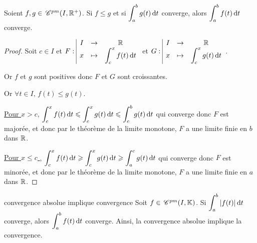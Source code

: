 \begin{proposition}{}{}
    Soient $f, g \in \,\mathscr C^{pm}(I, \mathbb{R}^+)$. Si $f \leqslant g$ et si
    $\displaystyle \int_{a }^{b } g(t) \,\mathrm{d}t$ converge, alors $\displaystyle \int_{a }^{b } f(t) \,\mathrm{d}t$ converge.
\end{proposition}


\begin{proof}
    Soit $c \in I$ et $F: \space \begin{array}{|ccc} \displaystyle I & \to & \displaystyle \mathbb{R} \\ \displaystyle x & \mapsto & \displaystyle \int_c^x f(t) \,\mathrm{d}t \end{array}$ et $G: \space \begin{array}{|ccc} \displaystyle I & \to & \displaystyle \mathbb{R} \\ \displaystyle x & \mapsto & \displaystyle \int_c^x g(t) \,\mathrm{d}t \end{array}$.

    Or $f$ et $g$ sont positives donc $F$ et $G$ sont croissantes.

    Or $\forall t \in I, \, f(t) \leqslant g(t)$. 

    \uline{Pour $x > c$}, $\displaystyle \int_{c }^{x } f(t) \,\mathrm{d}t \leqslant \int_{c }^{x } g(t) \,\mathrm{d}t \leqslant \int_{c }^{b } g(t) \,\mathrm{d}t$ qui converge 
    donc $F$ est majorée, et donc par le théorème de la limite monotone, $F$ a une limite finie en $b$ dans $\mathbb{R}$.

    \avspace \uline{Pour $x \leqslant c$ }, $\displaystyle \int_{c }^{x } f(t) \,\mathrm{d}t \geqslant \int_{c }^{x } g(t) \,\mathrm{d}t \geqslant \int_{a }^{c } g(t) \,\mathrm{d}t$ qui converge
    donc $F$ est minorée, et donc par le théorème de la limite monotone, $F$ a une limite finie en $a$ dans $\mathbb{R}$.
\end{proof}


\begin{theoreme}{convergence absolue implique convergence}{}
    Soit $f \in \,\mathscr C^{pm}(I, \mathbb{K})$. Si $\displaystyle \int_{a }^{b } |f(t)| \,\mathrm{d}t$ converge, alors 
    $\displaystyle \int_{a }^{b } f(t) \,\mathrm{d}t$ converge. Ainsi, la convergence absolue 
    implique la convergence.
\end{theoreme}


